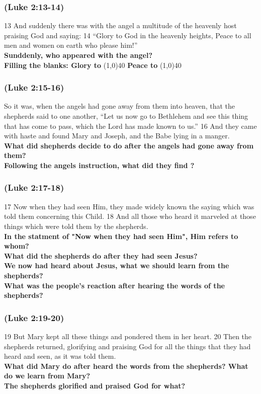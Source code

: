 \subsubsection{(Luke 2:13-14) }
13 And suddenly there was with the angel a multitude of the heavenly host praising God and saying: 14 “Glory to God in the heavenly heights, Peace to all men and women on earth who please him!”\\
\textbf{Sunddenly, who appeared with the angel?}\\
\textbf{Filling the blanks: \hspace{1cm} Glory to}  \line(1,0){40} \hspace{1cm} \textbf{Peace to} \line(1,0){40}\\

\subsubsection{(Luke 2:15-16) }
So it was, when the angels had gone away from them into heaven, that the shepherds said to one another, “Let us now go to Bethlehem and see this thing that has come to pass, which the Lord has made known to us.” 16 And they came with haste and found Mary and Joseph, and the Babe lying in a manger. \\
\textbf{What did shepherds decide to do after the angels had gone away from them?}\\
\textbf{Following the angels instruction, what did they find ?}\\

\subsubsection{(Luke 2:17-18) }
17 Now when they had seen Him, they made widely known the saying which was told them concerning this Child. 18 And all those who heard it marveled at those things which were told them by the shepherds. \\
\textbf{In the statment of "Now when they had seen Him", Him refers to whom?}\\
\textbf{What did the shepherds do after they had seen Jesus?}\\
\textbf{We now had heard about Jesus, what we should learn from the shepherds?}\\
\textbf{What was the people's reaction after hearing the words of the shepherds?}\\

\subsubsection{(Luke 2:19-20) }
19 But Mary kept all these things and pondered them in her heart. 20 Then the shepherds returned, glorifying and praising God for all the things that they had heard and seen, as it was told them.\\
\textbf{What did Mary do after heard the words from the shepherds? What do we learn from Mary?}\\
\textbf{The shepherds glorified and praised God for what?}







